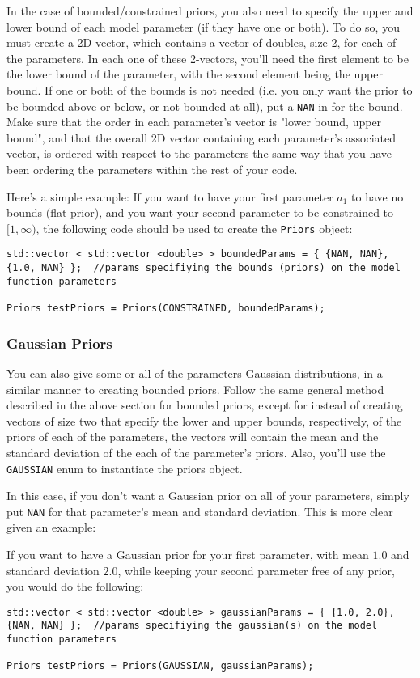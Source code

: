 \documentclass[12pt]{article}
\newcommand{\li}{\lstinline}
\begin{document}
In the case of bounded/constrained priors, you also need to specify the upper and lower bound of each model parameter (if they have one or both). To do so, you must create a 2D vector, which contains a vector of doubles, size 2, for each of the parameters. In each one of these 2-vectors, you'll need the first element to be the lower bound of the parameter, with the second element being the upper bound. If one or both of the bounds is not needed (i.e. you only want the prior to be bounded above or below, or not bounded at all), put a \li{NAN} in for the bound. Make sure that the order in each parameter's vector is "lower bound, upper bound", and that the overall 2D vector containing each parameter's associated vector, is ordered with respect to the parameters the same way that you have been ordering the parameters within the rest of your code.
\par Here's a simple example: If you want to have your first parameter $a_1$ to have no bounds (flat prior), and you want your second parameter to be constrained to $[1,\infty)$, the following code should be used to create the \li{Priors} object:
\begin{lstlisting}
std::vector < std::vector <double> > boundedParams = { {NAN, NAN}, {1.0, NAN} };  //params specifiying the bounds (priors) on the model function parameters

Priors testPriors = Priors(CONSTRAINED, boundedParams);
\end{lstlisting}
\subsubsection{Gaussian Priors}
\par You can also give some or all of the parameters Gaussian distributions, in a similar manner to creating bounded priors. Follow the same general method described in the above section for bounded priors, except for instead of creating vectors of size two that specify the lower and upper bounds, respectively, of the priors of each of the parameters, the vectors will contain the mean and the standard deviation of the each of the parameter's priors. Also, you'll use the \li{GAUSSIAN} enum to instantiate the priors object. 

In this case, if you don't want a Gaussian prior on all of your parameters, simply put \li{NAN} for that parameter's mean and standard deviation. This is more clear given an example:
\par If you want to have a Gaussian prior for your first parameter, with mean $1.0$ and standard deviation $2.0$, while keeping your second parameter free of any prior, you would do the following:
\begin{lstlisting}
std::vector < std::vector <double> > gaussianParams = { {1.0, 2.0}, {NAN, NAN} };  //params specifiying the gaussian(s) on the model function parameters

Priors testPriors = Priors(GAUSSIAN, gaussianParams);
\end{lstlisting}
\end{document}
